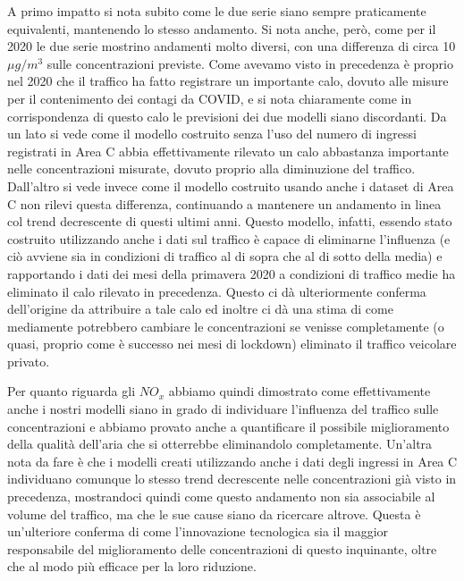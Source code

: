 \documentclass[a4paper]{report}
\begin{document}
A primo impatto si nota subito come le due serie siano sempre praticamente equivalenti, mantenendo lo stesso andamento. Si nota anche, però, come per il 2020 le due serie mostrino andamenti molto diversi, con una differenza di circa 10 $\mu g/m^3$ sulle concentrazioni previste.
Come avevamo visto in precedenza è proprio nel 2020 che il traffico ha fatto registrare un importante calo, dovuto alle misure per il contenimento dei contagi da COVID, e si nota chiaramente come in corrispondenza di questo calo le previsioni dei due modelli siano discordanti.
Da un lato si vede come il modello costruito senza l'uso del numero di ingressi registrati in Area C abbia effettivamente rilevato un calo abbastanza importante nelle concentrazioni misurate, dovuto proprio alla diminuzione del traffico. Dall'altro si vede invece come il modello costruito usando anche i dataset di Area C non rilevi questa differenza, continuando a mantenere un andamento in linea col trend decrescente di questi ultimi anni. Questo modello, infatti, essendo stato costruito utilizzando anche i dati sul traffico è capace di eliminarne l'influenza (e ciò avviene sia in condizioni di traffico al di sopra che al di sotto della media) e rapportando i dati dei mesi della primavera 2020 a condizioni di traffico medie ha eliminato il calo rilevato in precedenza. Questo ci dà ulteriormente conferma dell'origine da attribuire a tale calo ed inoltre ci dà una stima di come mediamente potrebbero cambiare le concentrazioni se venisse completamente (o quasi, proprio come è successo nei mesi di lockdown) eliminato il traffico veicolare privato.

Per quanto riguarda gli $NO_x$ abbiamo quindi dimostrato come effettivamente anche i nostri modelli siano in grado di individuare l'influenza del traffico sulle concentrazioni e abbiamo provato anche a quantificare il possibile miglioramento della qualità dell'aria che si otterrebbe eliminandolo completamente.
Un'altra nota da fare è che i modelli creati utilizzando anche i dati degli ingressi in Area C individuano comunque lo stesso trend decrescente nelle concentrazioni già visto in precedenza, mostrandoci quindi come questo andamento non sia associabile al volume del traffico, ma che le sue cause siano da ricercare altrove. Questa è un'ulteriore conferma di come l'innovazione tecnologica sia il maggior responsabile del miglioramento delle concentrazioni di questo inquinante, oltre che al modo più efficace per la loro riduzione.
\end{document}
